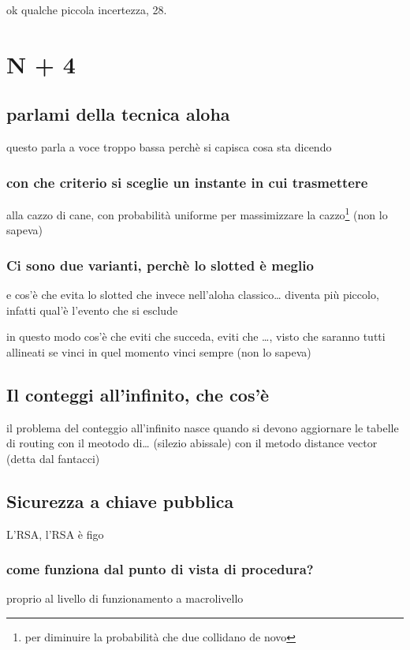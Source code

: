 \documentclass[11pt]{article}
\begin{document}
ok qualche piccola incertezza, 28.

\section{N + 4}
\label{sec:org9cbba23}
\subsection{parlami della tecnica aloha}
\label{sec:orgee1c1d9}
questo parla a voce troppo bassa perchè si capisca cosa sta dicendo
\subsubsection{con che criterio si sceglie un instante in cui trasmettere}
\label{sec:orgc9a158e}
alla cazzo di cane, con probabilità uniforme per massimizzare la cazzo\footnote{per diminuire la probabilità che due collidano de novo}
(non lo sapeva)

\subsubsection{Ci sono due varianti, perchè lo slotted è meglio}
\label{sec:org5931e0d}
e cos'è che evita lo slotted che invece nell'aloha classico\ldots{}
diventa più piccolo, infatti qual'è l'evento che si esclude

in questo modo cos'è che eviti che succeda, eviti che \ldots{}, visto che saranno tutti allineati se vinci in quel momento vinci sempre
(non lo sapeva)

\subsection{Il conteggi all'infinito, che cos'è}
\label{sec:orga8105b1}
il problema del conteggio all'infinito nasce quando si devono aggiornare le tabelle di routing con il meotodo di\ldots{}
(silezio abissale)
con il metodo distance vector (detta dal fantacci)

\subsection{Sicurezza a chiave pubblica}
\label{sec:org72024e3}
L'RSA, l'RSA è figo
\subsubsection{come funziona dal punto di vista di procedura?}
\label{sec:org389c937}
proprio al livello di funzionamento a macrolivello
\end{document}
